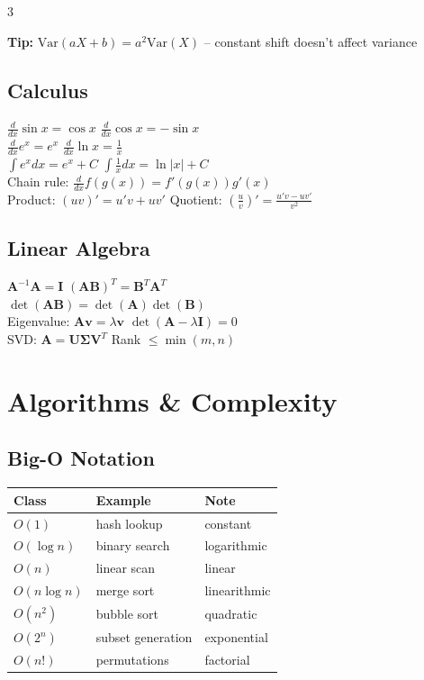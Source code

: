 \documentclass[7pt,landscape]{extarticle}
\begin{document}
\begin{multicols*}{3}
\begin{tipbox}
\textbf{Tip:} $\text{Var}(aX+b) = a^2\text{Var}(X)$ -- constant shift doesn't affect variance
\end{tipbox}

\subsection*{Calculus}
$\frac{d}{dx}\sin x = \cos x$ \hfill $\frac{d}{dx}\cos x = -\sin x$ \\
$\frac{d}{dx}e^x = e^x$ \hfill $\frac{d}{dx}\ln x = \frac{1}{x}$ \\
$\int e^x dx = e^x + C$ \hfill $\int \frac{1}{x} dx = \ln|x| + C$ \\
Chain rule: $\frac{d}{dx}f(g(x)) = f'(g(x))g'(x)$ \\
Product: $(uv)' = u'v + uv'$ \hfill Quotient: $(\tfrac{u}{v})' = \tfrac{u'v-uv'}{v^2}$

\subsection*{Linear Algebra}
$\mathbf{A}^{-1}\mathbf{A} = \mathbf{I}$ \hfill $(\mathbf{AB})^T = \mathbf{B}^T\mathbf{A}^T$ \\
$\det(\mathbf{AB}) = \det(\mathbf{A})\det(\mathbf{B})$ \\
Eigenvalue: $\mathbf{A}\mathbf{v} = \lambda\mathbf{v}$ \hfill $\det(\mathbf{A}-\lambda\mathbf{I}) = 0$ \\
SVD: $\mathbf{A} = \mathbf{U}\mathbf{\Sigma}\mathbf{V}^T$ \hfill Rank $\leq \min(m,n)$

\section*{Algorithms \& Complexity}

\subsection*{Big-O Notation}
{\fontsize{5.5pt}{6.5pt}\selectfont
\begin{tabular}{@{}l@{\,}l@{\,}l@{}}
\toprule
\textbf{Class} & \textbf{Example} & \textbf{Note} \\
\midrule
$O(1)$ & hash lookup & constant \\
$O(\log n)$ & binary search & logarithmic \\
$O(n)$ & linear scan & linear \\
$O(n \log n)$ & merge sort & linearithmic \\
$O(n^2)$ & bubble sort & quadratic \\
$O(2^n)$ & subset generation & exponential \\
$O(n!)$ & permutations & factorial \\
\bottomrule
\end{tabular}}


\end{multicols*}
\end{document}
